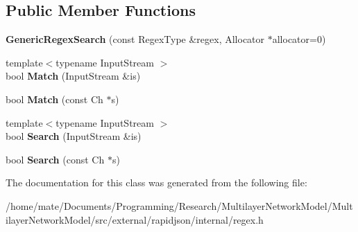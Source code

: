 \subsection*{Public Member Functions}
\begin{DoxyCompactItemize}
\item 
{\bfseries Generic\+Regex\+Search} (const Regex\+Type \&regex, Allocator $\ast$allocator=0)\hypertarget{classinternal_1_1GenericRegexSearch_a72f70e210a4bc944dba62655a008750b}{}\label{classinternal_1_1GenericRegexSearch_a72f70e210a4bc944dba62655a008750b}

\item 
{\footnotesize template$<$typename Input\+Stream $>$ }\\bool {\bfseries Match} (Input\+Stream \&is)\hypertarget{classinternal_1_1GenericRegexSearch_ad204164a20e3ac403b405683b51c2d0b}{}\label{classinternal_1_1GenericRegexSearch_ad204164a20e3ac403b405683b51c2d0b}

\item 
bool {\bfseries Match} (const Ch $\ast$s)\hypertarget{classinternal_1_1GenericRegexSearch_a9d3fe83905549d2fd4c513b8eacd14de}{}\label{classinternal_1_1GenericRegexSearch_a9d3fe83905549d2fd4c513b8eacd14de}

\item 
{\footnotesize template$<$typename Input\+Stream $>$ }\\bool {\bfseries Search} (Input\+Stream \&is)\hypertarget{classinternal_1_1GenericRegexSearch_a766c684321471b468ff468648f186cf0}{}\label{classinternal_1_1GenericRegexSearch_a766c684321471b468ff468648f186cf0}

\item 
bool {\bfseries Search} (const Ch $\ast$s)\hypertarget{classinternal_1_1GenericRegexSearch_a97398161c60f3ed3e4aabaff952c6f1e}{}\label{classinternal_1_1GenericRegexSearch_a97398161c60f3ed3e4aabaff952c6f1e}

\end{DoxyCompactItemize}


The documentation for this class was generated from the following file\+:\begin{DoxyCompactItemize}
\item 
/home/mate/\+Documents/\+Programming/\+Research/\+Multilayer\+Network\+Model/\+Multilayer\+Network\+Model/src/external/rapidjson/internal/regex.\+h\end{DoxyCompactItemize}
